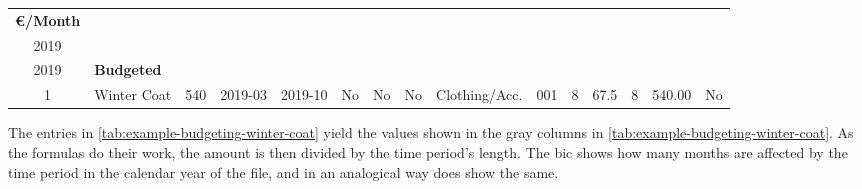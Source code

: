\begin{table}[hbtp]
\begin{tabular}{|c|l|l|l|l|c|c|c|r|c|r|c|r|r|c|}
		\footnotesize\bfseries €/Month &
		\begin{minipage}[b]{1.2cm}\footnotesize\bfseries
			Months in\\
			2019
		\end{minipage} &
		\begin{minipage}[b]{0.6cm}\footnotesize\bfseries
			€ in\\
			2019
		\end{minipage} &
		\footnotesize\bfseries Budgeted\\ 
		\hline
		\hline
		1 & Winter Coat & 540 & 2019-03 & 2019-10 & No & No & No & Clothing/Acc. & \cellcolor{lightgray}001 & \cellcolor{lightgray}8 & \cellcolor{lightgray}67.5 & \cellcolor{lightgray}8 & \cellcolor{lightgray}540.00 & \cellcolor{lightgray}No\\
		\hline
	\end{tabular}
\end{table}

The entries in \autoref{tab:example-budgeting-winter-coat} yield the values shown in the gray columns in \autoref{tab:example-budgeting-winter-coat}.
As the formulas do their work, the amount is then divided by the time period's length.
The \ac{bic}  shows how many months are affected by the time period in the calendar year of the file, and in an analogical way does  show the same.


